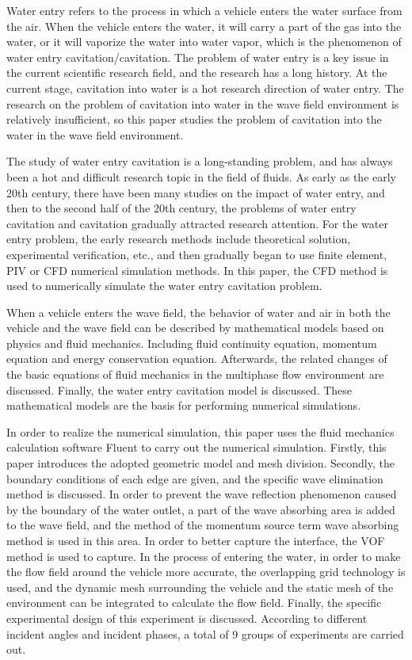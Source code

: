 \begin{abstract*}
  Water entry refers to the process in which a vehicle enters the water surface from the air. When the vehicle enters the water, it will carry a part of the gas into the water, or it will vaporize the water into water vapor, which is the phenomenon of water entry cavitation/cavitation. The problem of water entry is a key issue in the current scientific research field, and the research has a long history. At the current stage, cavitation into water is a hot research direction of water entry. The research on the problem of cavitation into water in the wave field environment is relatively insufficient, so this paper studies the problem of cavitation into the water in the wave field environment.

  The study of water entry cavitation is a long-standing problem, and has always been a hot and difficult research topic in the field of fluids. As early as the early 20th century, there have been many studies on the impact of water entry, and then to the second half of the 20th century, the problems of water entry cavitation and cavitation gradually attracted research attention. For the water entry problem, the early research methods include theoretical solution, experimental verification, etc., and then gradually began to use finite element, PIV or CFD numerical simulation methods. In this paper, the CFD method is used to numerically simulate the water entry cavitation problem.

  When a vehicle enters the wave field, the behavior of water and air in both the vehicle and the wave field can be described by mathematical models based on physics and fluid mechanics. Including fluid continuity equation, momentum equation and energy conservation equation. Afterwards, the related changes of the basic equations of fluid mechanics in the multiphase flow environment are discussed. Finally, the water entry cavitation model is discussed. These mathematical models are the basis for performing numerical simulations.

  In order to realize the numerical simulation, this paper uses the fluid mechanics calculation software Fluent to carry out the numerical simulation. Firstly, this paper introduces the adopted geometric model and mesh division. Secondly, the boundary conditions of each edge are given, and the specific wave elimination method is discussed. In order to prevent the wave reflection phenomenon caused by the boundary of the water outlet, a part of the wave absorbing area is added to the wave field, and the method of the momentum source term wave absorbing method is used in this area. In order to better capture the interface, the VOF method is used to capture. In the process of entering the water, in order to make the flow field around the vehicle more accurate, the overlapping grid technology is used, and the dynamic mesh surrounding the vehicle and the static mesh of the environment can be integrated to calculate the flow field. Finally, the specific experimental design of this experiment is discussed. According to different incident angles and incident phases, a total of 9 groups of experiments are carried out.


\end{abstract*}
